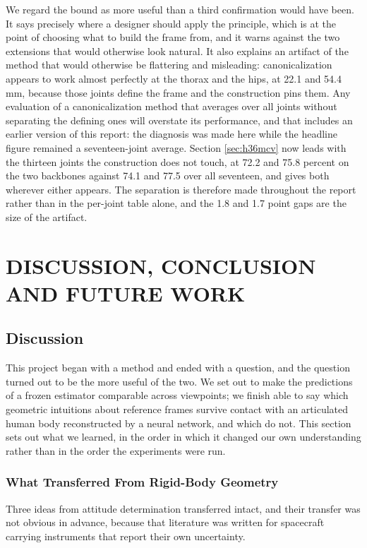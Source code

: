 \documentclass[12pt,a4paper]{report}
\begin{document}
We regard the bound as more useful than a third confirmation would have been. It says precisely where a designer should apply the principle, which is at the point of choosing what to build the frame from, and it warns against the two extensions that would otherwise look natural. It also explains an artifact of the method that would otherwise be flattering and misleading: canonicalization appears to work almost perfectly at the thorax and the hips, at 22.1 and 54.4 mm, because those joints define the frame and the construction pins them. Any evaluation of a canonicalization method that averages over all joints without separating the defining ones will overstate its performance, and that includes an earlier version of this report: the diagnosis was made here while the headline figure remained a seventeen-joint average. Section \ref{sec:h36mcv} now leads with the thirteen joints the construction does not touch, at 72.2 and 75.8 percent on the two backbones against 74.1 and 77.5 over all seventeen, and gives both wherever either appears. The separation is therefore made throughout the report rather than in the per-joint table alone, and the 1.8 and 1.7 point gaps are the size of the artifact.

\chapter{DISCUSSION, CONCLUSION AND FUTURE WORK}

\section{Discussion}
\label{sec:discussion}

This project began with a method and ended with a question, and the question turned out to be the more useful of the two. We set out to make the predictions of a frozen estimator comparable across viewpoints; we finish able to say which geometric intuitions about reference frames survive contact with an articulated human body reconstructed by a neural network, and which do not. This section sets out what we learned, in the order in which it changed our own understanding rather than in the order the experiments were run.

\subsection*{What Transferred From Rigid-Body Geometry}

Three ideas from attitude determination transferred intact, and their transfer was not obvious in advance, because that literature was written for spacecraft carrying instruments that report their own uncertainty.
\end{document}
